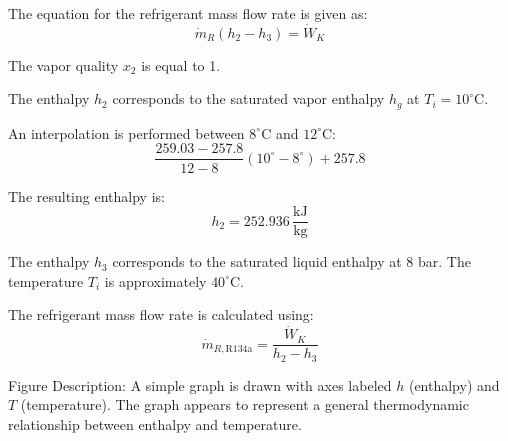 The equation for the refrigerant mass flow rate is given as:  
\[
\dot{m}_R (h_2 - h_3) = \dot{W}_K
\]  

The vapor quality \( x_2 \) is equal to 1.  

The enthalpy \( h_2 \) corresponds to the saturated vapor enthalpy \( h_g \) at \( T_i = 10^\circ\text{C} \).  

An interpolation is performed between \( 8^\circ\text{C} \) and \( 12^\circ\text{C} \):  
\[
\frac{259.03 - 257.8}{12 - 8} (10^\circ - 8^\circ) + 257.8
\]  

The resulting enthalpy is:  
\[
h_2 = 252.936 \, \frac{\text{kJ}}{\text{kg}}
\]  

The enthalpy \( h_3 \) corresponds to the saturated liquid enthalpy at 8 bar.  
The temperature \( T_i \) is approximately \( 40^\circ\text{C} \).  

The refrigerant mass flow rate is calculated using:  
\[
\dot{m}_{R,\text{R134a}} = \frac{\dot{W}_K}{h_2 - h_3}
\]  

Figure Description:  
A simple graph is drawn with axes labeled \( h \) (enthalpy) and \( T \) (temperature). The graph appears to represent a general thermodynamic relationship between enthalpy and temperature.